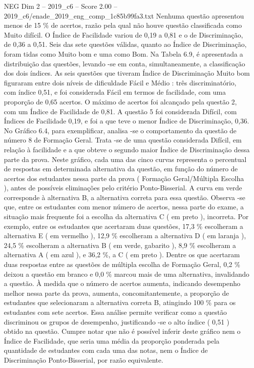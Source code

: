 \begin{textsample}{NEG Dim 2 – 2019\_c6 – Score 2.00 – 2019\_c6/enade\_2019\_eng\_comp\_1c85b99fa3.txt}
Nenhuma questão apresentou menos de 15 \% de acertos, razão pela qual não houve questão classificada como Muito difícil.
O Índice de Facilidade variou de 0,19 a 0,81 e o de Discriminação, de 0,36 a 0,51.
Seis das sete questões válidas, quanto ao Índice de Discriminação, foram tidas como Muito bom e uma como Bom.
Na Tabela 6.9, é apresentada a distribuição das questões, levando -se em conta, simultaneamente, a classificação dos dois índices.
As seis questões que tiveram Índice de Discriminação Muito bom figuraram entre dois níveis de dificuldade Fácil e Médio : três discriminatório, com índice 0,51, e foi considerada Fácil em termos de facilidade, com uma proporção de 0,65 acertos.
O máximo de acertos foi alcançado pela questão 2, com um Índice de Facilidade de 0,81.
A questão 5 foi considerada Difícil, com Índices de Facilidade 0,19, e foi a que teve o menor Índice de Discriminação, 0,36.
No Gráfico 6.4, para exemplificar, analisa -se o comportamento da questão de número 8 de Formação Geral.
Trata -se de uma questão considerada Difícil, em relação à facilidade e a que obteve o segundo maior Índice de Discriminação dessa parte da prova.
Neste gráfico, cada uma das cinco curvas representa o percentual de respostas em determinada alternativa da questão, em função do número de acertos dos estudantes nessa parte da prova ( Formação Geral/Múltipla Escolha ), antes de possíveis eliminações pelo critério Ponto-Bisserial.
A curva em verde corresponde à alternativa B, a alternativa correta para essa questão.
Observa -se que, entre os estudantes com menor número de acertos, nessa parte do exame, a situação mais frequente foi a escolha da alternativa C ( em preto ), incorreta.
Por exemplo, entre os estudantes que acertaram duas questões, 17,3 \% escolheram a alternativa E ( em vermelho ), 12,9 \% escolheram a alternativa D ( em laranja ), 24,5 \% escolheram a alternativa B ( em verde, gabarito ), 8,9 \% escolheram a alternativa A ( em azul ), e 36,2 \%, a C ( em preto ).
Dentre os que acertaram duas respostas entre as questões de múltipla escolha de Formação Geral, 0,2 \% deixou a questão em branco e 0,0 \% marcou mais de uma alternativa, invalidando a questão.
À medida que o número de acertos aumenta, indicando desempenho melhor nessa parte da prova, aumenta, concomitantemente, a proporção de estudantes que selecionaram a alternativa correta B, atingindo 100 \% para os estudantes com sete acertos.
Essa análise permite verificar como a questão discriminou os grupos de desempenho, justificando -se o alto índice ( 0,51 ) obtido na questão.
Cumpre notar que não é possível inferir deste gráfico nem o Índice de Facilidade, que seria uma média da proporção ponderada pela quantidade de estudantes com cada uma das notas, nem o Índice de Discriminação Ponto-Bisserial, por razão equivalente.

\end{textsample}
